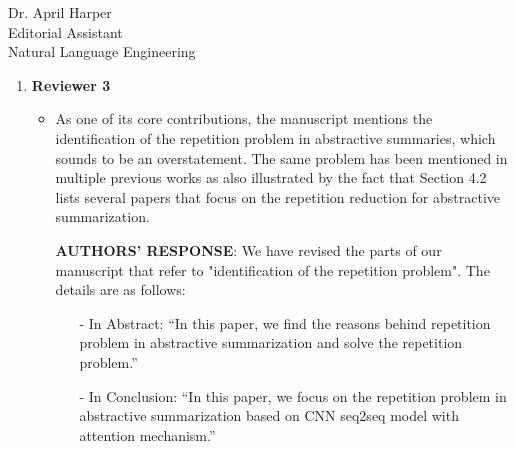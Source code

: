 \documentclass[11pt]{letter} %
\theoremstyle{definition}
\begin{document}
\begin{letter}{Dr. April Harper \\
            Editorial Assistant \\
			Natural Language Engineering}
\begin{enumerate}
			\item \textbf{Reviewer 3}
			\begin{itemize}
			    \item As one of its core contributions, the manuscript mentions the identification of the repetition problem in abstractive summaries, which sounds to be an overstatement. The same problem has been mentioned in multiple previous works as also illustrated by the fact that Section 4.2 lists several papers that focus on the repetition reduction for abstractive summarization.
			    \item[] \textbf{AUTHORS' RESPONSE}:  
			    We have revised the parts of our manuscript that refer to "identification of the repetition problem".
			    The details are as follows:
			    \begin{itemize}
			    	\item[-] In Abstract: ``In this paper, we find the reasons behind repetition problem in abstractive summarization and solve the repetition problem.'' 
			    	\item[-] In Conclusion: ``In this paper, we focus on the repetition problem in abstractive summarization based on CNN seq2seq model with attention mechanism.'' 
			    \end{itemize}
			    				

\end{itemize}
\end{enumerate}
\end{letter}
\end{document}
